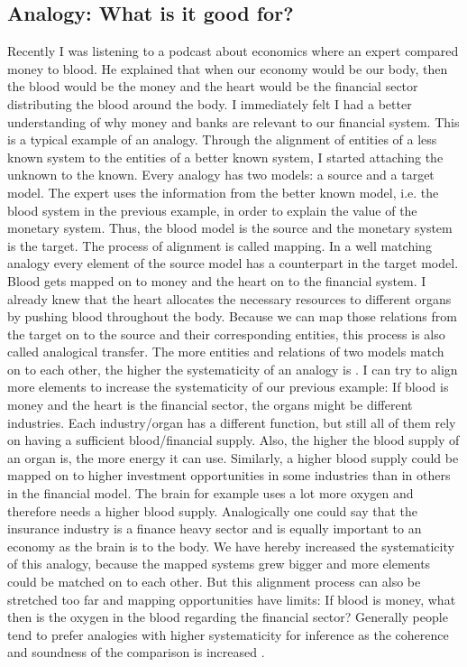 \documentclass[a4paper,man,natbib,floatsintext,import]{apa6}
\begin{document}
\subsection{Analogy: What is it good for?}
Recently I was listening to a podcast about economics where an expert compared money to blood. He explained that when our economy would be our body, then the blood would be the money and the heart would be the financial sector distributing the blood around the body. I immediately felt I had a better understanding of why money and banks are relevant to our financial system.
This is a typical example of an analogy. Through the alignment of entities of a less known system to the entities of a better known system, I started attaching the unknown to the known. Every analogy has two models: a source and a target model. The expert uses the information from the better known model, i.e. the blood system in the previous example, in order to explain the value of the monetary system. Thus, the blood model is the source and the monetary system is the target. The process of alignment is called mapping. In a well matching analogy every element of the source model has a counterpart in the target model. Blood gets mapped on to money and the heart on to the financial system. I already knew that the heart allocates the necessary resources to different organs by pushing blood throughout the body. Because we can map those relations from the target on to the source and their corresponding entities, this process is also called analogical transfer. The more entities and relations of two models match on to each other, the higher the systematicity of an analogy is \citep{Gentner1997}. I can try to align more elements to increase the systematicity of our previous example: If blood is money and the heart is the financial sector, the organs might be different industries. Each industry/organ has a different function, but still all of them rely on having a sufficient blood/financial supply. Also, the higher the blood supply of an organ is, the more energy it can use. Similarly, a higher blood supply could be mapped on to higher investment opportunities in some industries than in others in the financial model. The brain for example uses a lot more oxygen and therefore needs a higher blood supply. Analogically one could say that the insurance industry is a finance heavy sector and is equally important to an economy as the brain is to the body. We have hereby increased the systematicity of this analogy, because the mapped systems grew bigger and more elements could be matched on to each other. But this alignment process can also be stretched too far and mapping opportunities have limits: If blood is money, what then is the oxygen in the blood regarding the financial sector? Generally people tend to prefer analogies with higher systematicity for inference as the coherence and soundness of the comparison is increased \citep{Clement1991}.
\end{document}
